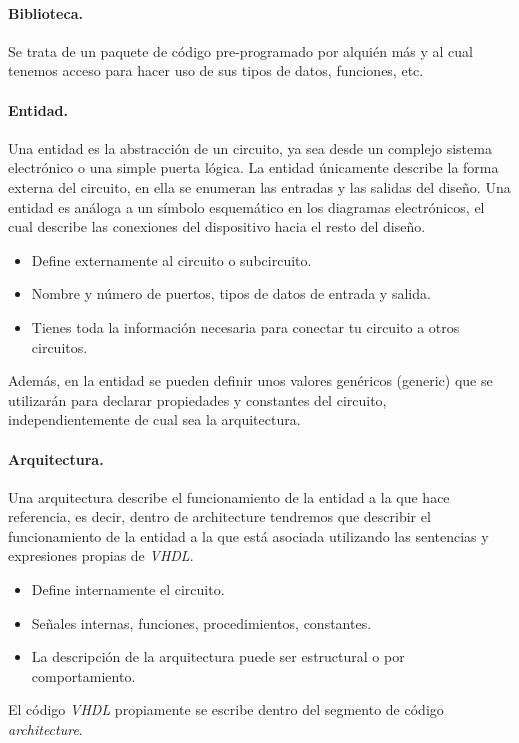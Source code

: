 \documentclass[../procedimientos.tex]{subfiles}
\begin{document}
\paragraph{Biblioteca.} Se trata de un paquete de código pre-programado por 
alquién más y al cual tenemos acceso para hacer uso de sus tipos de datos, 
funciones, etc.

\paragraph{Entidad.} Una entidad es la abstracción de un circuito, ya sea 
desde un complejo sistema electrónico o una simple puerta lógica. La 
entidad únicamente describe la forma externa del circuito, en ella se 
enumeran las entradas y las salidas del diseño. Una entidad es análoga a 
un símbolo esquemático en los diagramas electrónicos, el cual describe las 
conexiones del  dispositivo hacia el resto del diseño.
\begin{itemize}
  \item Define externamente al circuito o subcircuito.
  \item Nombre y número de puertos, tipos de datos de entrada y salida.
  \item Tienes toda la información necesaria para conectar tu circuito a 
    otros circuitos.
\end{itemize}
Además, en la entidad se pueden definir unos valores genéricos (generic) que 
se utilizarán para declarar propiedades y constantes del circuito, 
independientemente de cual sea la arquitectura.

\paragraph{Arquitectura.} Una arquitectura describe el funcionamiento de la 
entidad a la que hace referencia, es decir, dentro de architecture tendremos 
que describir el funcionamiento de la entidad a la que está asociada 
utilizando las sentencias y expresiones propias de \textit{VHDL}.
\begin{itemize}
  \item Define internamente el circuito.
  \item Señales internas, funciones, procedimientos, constantes.
  \item La descripción de la arquitectura puede ser estructural o por 
    comportamiento.
\end{itemize}
El código \textit{VHDL} propiamente se escribe dentro del segmento de código 
\textit{architecture}.
\end{document}
